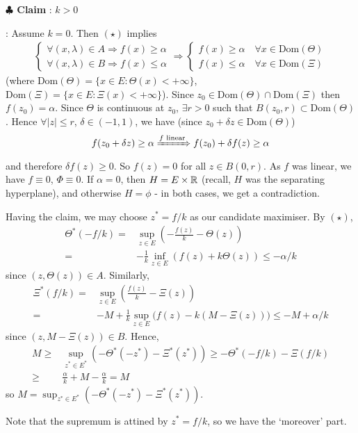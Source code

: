 \documentclass[12pt,a4paper]{article}
\newenvironment{proof}
{\begin{changemargin}{1cm}{0.5cm} 
	}%
	{\end{changemargin}
}
\newenvironment{subproof}
{\begin{changemargin}{0.5cm}{0.5cm} 
	}%
	{\end{changemargin}
}
\newenvironment{p}
{\begin{proof} 
	}%
	{\end{proof}
}
\begin{document}
\begin{p}
\textbf{$\clubsuit$ Claim} : $k>0$
\begin{subproof}
: Assume $k=0$. Then $(\star)$ implies
\begin{align*}
\begin{cases}
\forall (x, \lambda) \in A \Rightarrow f(x) \geq \alpha \\
\forall (x, \lambda) \in B \Rightarrow f(x) \leq \alpha
\end{cases} \Rightarrow \begin{cases}
f(x) \geq \alpha \quad \forall x\in \text{Dom}(\Theta)\\
f(x) \leq \alpha \quad \forall x\in \text{Dom}(\Xi)
\end{cases}
\end{align*}
(where $\text{Dom}(\Theta) = \{x\in E : \Theta(x) < + \infty \}$, $\text{Dom}(\Xi) = \{x\in E : \Xi(x) < + \infty \}$). Since $z_0 \in \text{Dom}(\Theta) \cap \text{Dom}(\Xi)$ then $f(z_0) = \alpha$. Since $\Theta$ is continuous at $z_0$, $\exists r>0$ such that $B(z_0, r) \subset \text{Dom}(\Theta)$. Hence $\forall |z| \leq r$, $\delta \in(-1,1)$, we have (since $z_0 + \delta z \in \text{Dom}(\Theta)$)
\begin{align*}
f(z_0 + \delta z) \geq \alpha \xRightarrow{f \text{ linear}} f(z_0) + \delta f(z) \geq \alpha
\end{align*}
and therefore $\delta f(z) \geq 0$. So $f(z) =0$ for all $z\in B(0, r)$. As $f$ was linear, we have $f\equiv 0$, $\Phi\equiv 0$. If $\alpha =0$, then $H = E\times \mathbb{R}$ (recall, $H$ was the separating hyperplane), and otherwise $H = \phi$ - in both cases, we get a contradiction.
\end{subproof}
Having the claim, we may choose $z^* = f/k$ as our candidate maximiser. By $(\star)$,
\begin{align*}
\Theta^* (-f/k) =& \sup_{z\in E}(- \frac{f(z)}{k} - \Theta(z)) \\
= & -\frac{1}{k} \inf_{z\in E} (f(z) + k\Theta (z)) \leq -\alpha /k
\end{align*}
since $(z, \Theta(z)) \in A$. Similarly,
\begin{align*}
\Xi^*(f/k) =& \sup_{z\in E} (\frac{f(z)}{k} - \Xi(z)) \\
=& -M + \frac{1}{k}\sup_{z\in E} \big( f(z) - k (M -\Xi(z)) \big) \leq -M + \alpha/k
\end{align*}
since $(z, M- \Xi(z)) \in B$. Hence,
\begin{align*}
M \geq & \sup_{z^* \in E^*} (-\Theta^*(-z^*) - \Xi^*(z^*)) \geq - \Theta^*(-f/k) - \Xi(f/k) \\
\geq & \frac{\alpha}{k} + M - \frac{\alpha}{k} = M
\end{align*}
so $M =\sup_{z^* \in E^*} (-\Theta^*(-z^*) - \Xi^*(z^*))$.
\s

Note that the supremum is attined by $z^* = f/k$, so we have the `moreover' part.

\eop
\end{p}
\s
\end{document}
